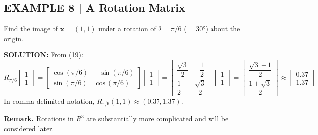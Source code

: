 \documentclass{article}
\theoremstyle{mystyle}
\begin{document}
\subsection*{EXAMPLE 8 | A Rotation Matrix}
Find the image of $\mathbf{x}=(1,1)$ under a rotation of $\theta=\pi/6$ ($=30°$) about the origin.

\textbf{SOLUTION:} From (19):
\[
R_{\pi/6}\begin{bmatrix}1\\1\end{bmatrix}
=\begin{bmatrix}\cos(\pi/6)&-\sin(\pi/6)\\\sin(\pi/6)&\cos(\pi/6)\end{bmatrix}\begin{bmatrix}1\\1\end{bmatrix}
=\begin{bmatrix}\dfrac{\sqrt{3}}{2}&-\dfrac{1}{2}\\[6pt]\dfrac{1}{2}&\dfrac{\sqrt{3}}{2}\end{bmatrix}\begin{bmatrix}1\\1\end{bmatrix}
=\begin{bmatrix}\dfrac{\sqrt{3}-1}{2}\\[6pt]\dfrac{1+\sqrt{3}}{2}\end{bmatrix}\approx\begin{bmatrix}0.37\\1.37\end{bmatrix}
\]
In comma-delimited notation, $R_{\pi/6}(1,1)\approx(0.37,1.37)$.

\noindent\textbf{Remark.} Rotations in $R^3$ are substantially more complicated and will be considered later.
\end{document}

